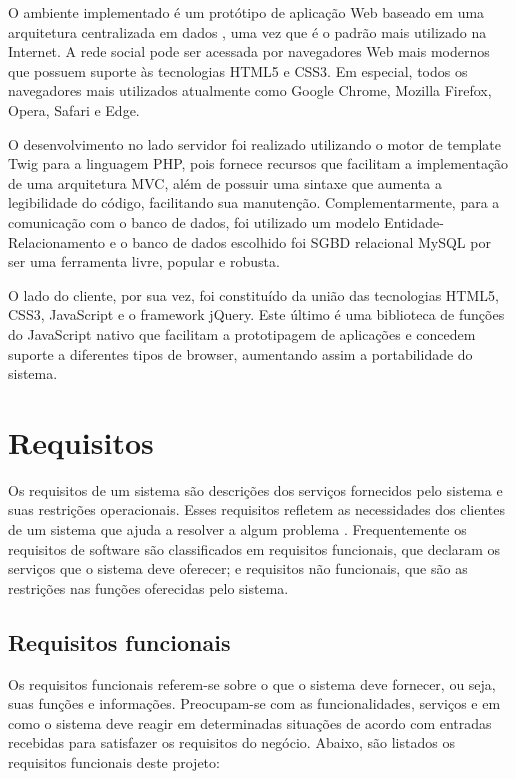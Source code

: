 \documentclass[cic,tc]{iiufrgs}
\begin{document}
O ambiente implementado é um protótipo de aplicação Web baseado em uma arquitetura centralizada em dados \cite{pressman}, uma vez que é o padrão mais utilizado na Internet. A rede social pode ser acessada por navegadores Web mais modernos que possuem suporte às tecnologias HTML5 e CSS3. Em especial, todos os navegadores mais utilizados atualmente como Google Chrome, Mozilla Firefox, Opera, Safari e Edge.

O desenvolvimento no lado servidor foi realizado utilizando o motor de template Twig para a linguagem PHP, pois fornece recursos que facilitam a implementação de uma arquitetura MVC, além de possuir uma sintaxe que aumenta a legibilidade do código, facilitando sua manutenção. Complementarmente, para a comunicação com o banco de dados, foi utilizado um modelo Entidade-Relacionamento e o banco de dados escolhido foi SGBD relacional MySQL por ser uma ferramenta livre, popular e robusta\cite{mysql}.

O lado do cliente, por sua vez, foi constituído da união das tecnologias HTML5, CSS3, JavaScript e o framework jQuery. Este último é uma biblioteca de funções do JavaScript nativo que facilitam a prototipagem de aplicações e concedem suporte a diferentes tipos de browser, aumentando assim a portabilidade do sistema.


\section{Requisitos}
\label{metodologiaRequisitos}
Os requisitos de um sistema são descrições dos serviços fornecidos pelo sistema e suas restrições operacionais. Esses requisitos refletem as necessidades dos clientes de um sistema que ajuda a resolver a algum problema \cite{sommerville}. Frequentemente os requisitos de software são classificados em requisitos funcionais, que declaram os serviços que o sistema deve oferecer; e requisitos não funcionais, que são as restrições nas funções oferecidas pelo sistema. 

\subsection{Requisitos funcionais}
\label{requisitosRF}
Os requisitos funcionais referem-se sobre o que o sistema deve fornecer, ou seja, suas funções e informações. Preocupam-se com as funcionalidades, serviços e em como o sistema deve reagir em determinadas situações de acordo com entradas recebidas para satisfazer os requisitos do negócio. Abaixo, são listados os requisitos funcionais deste projeto:  
\end{document}
